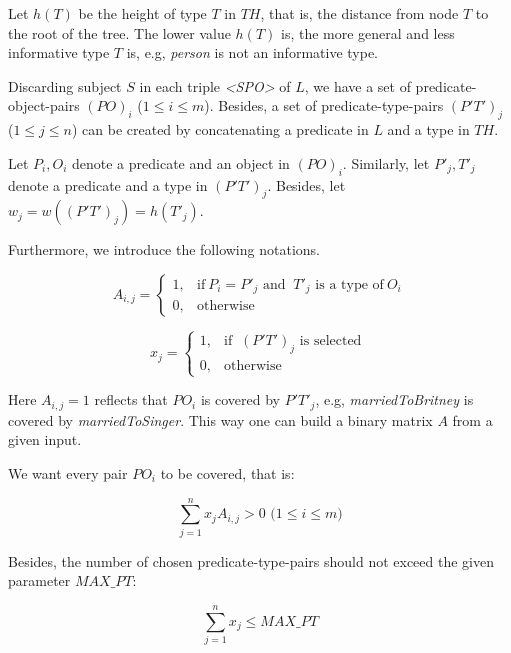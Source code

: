 Let $h(T)$ be the height of type $T$ in $TH$, that is, the distance from node $T$ to the root of the tree. The lower value $h(T)$ is, the more general and less informative type $T$ is, e.g, \textit{person} is not an informative type.

Discarding subject $S$ in each triple \textit{<SPO>} of $L$, we have a set of predicate-object-pairs $(PO)_{i}$ ($1 \leq i \leq m$). Besides, a set of predicate-type-pairs $(P'T')_{j}$ ($1 \leq j \leq n$) can be created by concatenating a predicate in $L$ and a type in $TH$.

Let $P_{i}, O_{i}$ denote a predicate and an object in $(PO)_{i}$. Similarly, let $P'_{j}, T'_{j}$ denote a predicate and a type in $(P'T')_{j}$. Besides, let $w_{j} = w((P'T')_{j}) = h(T'_{j})$.

Furthermore, we introduce the following notations.

\begin{equation}
    A_{i,j} =
    \begin{cases}
      1, & \text{if}\ P_{i} = P'_{j}  \text{ and }\ T'_{j} \text{ is a type of}\ O_{i}\\
      0, & \text{otherwise}
    \end{cases}
\end{equation}

\begin{equation}
    x_{j} =
    \begin{cases}
      1, & \text{if }\ (P'T')_{j} \text{ is selected}\ \\
      0, & \text{otherwise}
    \end{cases}
\end{equation}

Here $A_{i,j} = 1$ reflects that $PO_{i}$ is covered by $P'T'_{j}$, e.g, \textit{marriedToBritney} is covered by \textit{marriedToSinger}. This way one can build a binary matrix $A$ from a given input.

We want every pair $PO_{i}$ to be covered, that is:

\begin{equation}
\label{equa1}
\sum_{j=1}^{n}{x_{j} A_{i,j}} > 0  \text{ (}1 \leq i \leq m\text{)}
\end{equation}

Besides, the number of chosen predicate-type-pairs should not exceed the given parameter $MAX\_PT$:

\begin{equation}
\label{equa2}
\sum_{j=1}^{n}{x_{j}} \leq MAX\_PT
\end{equation}

